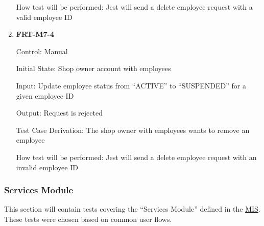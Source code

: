 \documentclass[12pt, titlepage]{article}
\begin{document}
\begin{enumerate}
	      How test will be performed: Jest will send a delete employee request with a valid employee ID

	\item \textbf{FRT-M7-4}

	      Control: Manual

	      Initial State: Shop owner account with employees

	      Input: Update employee status from ``ACTIVE'' to ``SUSPENDED'' for a given employee ID

	      Output: Request is rejected

	      Test Case Derivation: The shop owner with employees wants to remove an employee

	      How test will be performed: Jest will send a delete employee request with an invalid employee ID

\end{enumerate}

\subsubsection{Services Module}

This section will contain tests covering the ``Services Module'' defined in the
\href{https://github.com/arkinmodi/project-sayyara/blob/main/docs/Design/SoftDetailedDes/MIS.pdf}{MIS}.
These tests were chosen based on common user flows.
\end{document}
